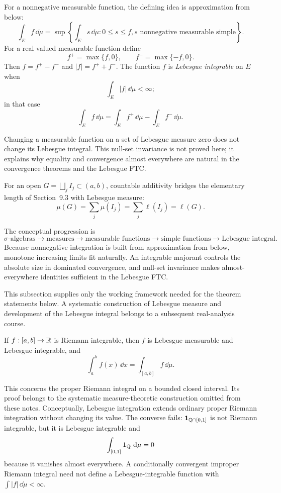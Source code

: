 For a nonnegative measurable function, the defining idea is approximation
from below:
\[
\boxed{
\int_E f\,\dd\mu
=\sup\left\{\int_Es\,\dd\mu:
0\leq s\leq f, s\text{ nonnegative measurable simple}\right\}.}
\]
For a real-valued measurable function define
\[
f^+=\max\{f,0\},\qquad f^-=\max\{-f,0\}.
\]
Then $f=f^+-f^-$ and $|f|=f^++f^-$. The function $f$ is \emph{Lebesgue
integrable} on $E$ when
\[
\int_E|f|\,\dd\mu<\infty;
\]
in that case
\[
\int_Ef\,\dd\mu=\int_Ef^+\,\dd\mu-\int_Ef^-\,\dd\mu.
\]

Changing a measurable function on a set of Lebesgue measure zero does not
change its Lebesgue integral. This null-set invariance is not proved here;
it explains why equality and convergence almost everywhere are natural in
the convergence theorems and the Lebesgue FTC.

For an open $G=\bigsqcup_jI_j\subset(a,b)$, countable additivity bridges
the elementary length of Section~9.3 with Lebesgue measure:
\[
\mu(G)=\sum_j\mu(I_j)=\sum_j\ell(I_j)=\ell(G).
\]

The conceptual progression is
\[
\boxed{\sigma\text{-algebras}\longrightarrow\text{measures}
\longrightarrow\text{measurable functions}\longrightarrow
\text{simple functions}\longrightarrow\text{Lebesgue integral}.}
\]
Because nonnegative integration is built from approximation from below,
monotone increasing limits fit naturally. An integrable majorant controls
the absolute size in dominated convergence, and null-set invariance makes
almost-everywhere identities sufficient in the Lebesgue FTC.

This subsection supplies only the working framework needed for the theorem
statements below. A systematic construction of Lebesgue measure and
development of the Lebesgue integral belongs to a subsequent real-analysis
course.

\begin{theorem}
\label{thm:riemann-lebesgue-compatibility-preview}
If $f:[a,b]\to\mathbb{R}$ is Riemann integrable, then $f$ is Lebesgue measurable and
Lebesgue integrable, and
\[
\boxed{\int_a^b f(x)\,\dd x=\int_{[a,b]}f\,\dd\mu.}
\]
\end{theorem}
This concerns the proper Riemann integral on a bounded closed interval. Its
proof belongs to the systematic measure-theoretic construction omitted from
these notes. Conceptually, Lebesgue integration extends ordinary proper
Riemann integration without changing its value. The converse fails:
$\mathbf1_{\mathbb{Q}\cap[0,1]}$ is not Riemann integrable, but it is Lebesgue
integrable and
\[
\int_{[0,1]}\mathbf1_{\mathbb{Q}}\,\mathop{}\!\mathrm{d}\mu=0
\]
because it vanishes almost everywhere. A conditionally convergent improper
Riemann integral need not define a Lebesgue-integrable function with
$\int|f|\,\dd\mu<\infty$.

